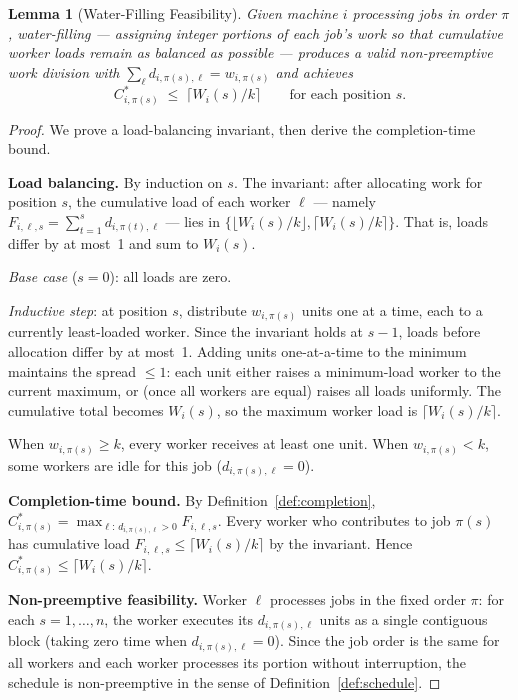 \documentclass[11pt,titlepage]{article}
\newtheorem{lemma}[theorem]{Lemma}
\begin{document}
\begin{lemma}[Water-Filling Feasibility]
\label{lem:waterfill}
Given machine $i$ processing jobs in order $\pi$, water-filling
--- assigning integer portions of each job's work so that
cumulative worker loads remain as balanced as possible ---
produces a valid non-preemptive work division with
$\sum_\ell d_{i,\pi(s),\ell} = w_{i,\pi(s)}$ and achieves
\[
  C^*_{i,\pi(s)} \;\leq\; \lceil W_i(s) / k \rceil
  \qquad\text{for each position } s.
\]
\end{lemma}

\begin{proof}
We prove a load-balancing invariant, then derive the
completion-time bound.

\medskip\noindent\textbf{Load balancing.}
By induction on $s$. The invariant: after allocating work for
position $s$, the cumulative load of each worker $\ell$ ---
namely $F_{i,\ell,s} = \sum_{t=1}^{s} d_{i,\pi(t),\ell}$ ---
lies in
$\{\lfloor W_i(s)/k \rfloor, \lceil W_i(s)/k \rceil\}$.
That is, loads differ by at most~1 and sum to $W_i(s)$.

\emph{Base case} ($s = 0$): all loads are zero.

\emph{Inductive step}: at position $s$, distribute
$w_{i,\pi(s)}$ units one at a time, each to a currently
least-loaded worker. Since the invariant holds at $s{-}1$,
loads before allocation differ by at most~1. Adding units
one-at-a-time to the minimum maintains the spread $\leq 1$:
each unit either raises a minimum-load worker to the current
maximum, or (once all workers are equal) raises all loads
uniformly. The cumulative total becomes $W_i(s)$, so the
maximum worker load is $\lceil W_i(s)/k \rceil$.

When $w_{i,\pi(s)} \geq k$, every worker receives at least one
unit. When $w_{i,\pi(s)} < k$, some workers are idle for this
job ($d_{i,\pi(s),\ell} = 0$).

\medskip\noindent\textbf{Completion-time bound.}
By Definition~\ref{def:completion},
$C^*_{i,\pi(s)} = \max_{\ell:\,d_{i,\pi(s),\ell}>0}
F_{i,\ell,s}$.
Every worker who contributes to job $\pi(s)$ has cumulative
load $F_{i,\ell,s} \leq \lceil W_i(s)/k \rceil$ by the
invariant. Hence
$C^*_{i,\pi(s)} \leq \lceil W_i(s)/k \rceil$.

\medskip\noindent\textbf{Non-preemptive feasibility.}
Worker $\ell$ processes jobs in the fixed order $\pi$:
for each $s = 1, \ldots, n$, the worker executes its
$d_{i,\pi(s),\ell}$ units as a single contiguous block
(taking zero time when $d_{i,\pi(s),\ell} = 0$). Since the
job order is the same for all workers and each worker processes
its portion without interruption, the schedule is
non-preemptive in the sense of Definition~\ref{def:schedule}.
\end{proof}
\end{document}
